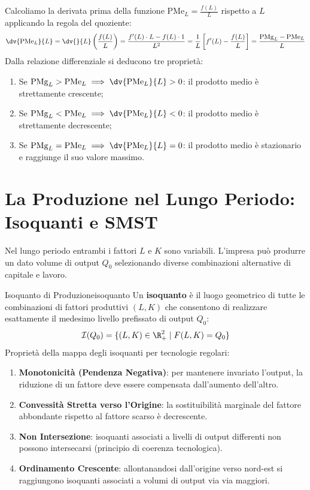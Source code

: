 \begin{dimostrazione}
Calcoliamo la derivata prima della funzione $\mathrm{PMe}_L = \frac{f(L)}{L}$ rispetto a $L$ applicando la regola del quoziente:
\begin{equation*}
    \dv{\mathrm{PMe}_L}{L} = \dv{}{L}\left(\frac{f(L)}{L}\right) = \frac{f'(L) \cdot L - f(L) \cdot 1}{L^2} = \frac{1}{L}\left[ f'(L) - \frac{f(L)}{L} \right] = \frac{\mathrm{PMg}_L - \mathrm{PMe}_L}{L}
\end{equation*}
Dalla relazione differenziale si deducono tre proprietà:
\begin{enumerate}
    \item Se $\mathrm{PMg}_L > \mathrm{PMe}_L \implies \dv{\mathrm{PMe}_L}{L} > 0$: il prodotto medio è strettamente crescente;
    \item Se $\mathrm{PMg}_L < \mathrm{PMe}_L \implies \dv{\mathrm{PMe}_L}{L} < 0$: il prodotto medio è strettamente decrescente;
    \item Se $\mathrm{PMg}_L = \mathrm{PMe}_L \implies \dv{\mathrm{PMe}_L}{L} = 0$: il prodotto medio è stazionario e raggiunge il suo valore massimo.
\end{enumerate}
\end{dimostrazione}

\section{La Produzione nel Lungo Periodo: Isoquanti e SMST}

Nel lungo periodo entrambi i fattori $L$ e $K$ sono variabili. L'impresa può produrre un dato volume di output $Q_0$ selezionando diverse combinazioni alternative di capitale e lavoro.

\begin{definizione}{Isoquanto di Produzione}{isoquanto}
Un \textbf{isoquanto} è il luogo geometrico di tutte le combinazioni di fattori produttivi $(L, K)$ che consentono di realizzare esattamente il medesimo livello prefissato di output $Q_0$:
\begin{equation}
    \mathcal{I}(Q_0) = \{ (L, K) \in \R_+^2 \mid F(L, K) = Q_0 \}
\end{equation}
Proprietà della mappa degli isoquanti per tecnologie regolari:
\begin{enumerate}
    \item \textbf{Monotonicità (Pendenza Negativa)}: per mantenere invariato l'output, la riduzione di un fattore deve essere compensata dall'aumento dell'altro.
    \item \textbf{Convessità Stretta verso l'Origine}: la sostituibilità marginale del fattore abbondante rispetto al fattore scarso è decrescente.
    \item \textbf{Non Intersezione}: isoquanti associati a livelli di output differenti non possono intersecarsi (principio di coerenza tecnologica).
    \item \textbf{Ordinamento Crescente}: allontanandosi dall'origine verso nord-est si raggiungono isoquanti associati a volumi di output via via maggiori.
\end{enumerate}
\end{definizione}

